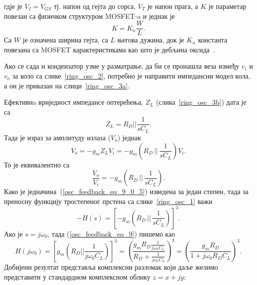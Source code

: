 \documentclass[master]{finthesis}
\begin{document}
гдје је $V_{I}=V_{GS}$ тј. напон од гејта до сорса, $V_{T}$ је напон прага, а $K$ је параметар повезан са физичком структуром MOSFET-a и једнак је
\begin{equation} 
	\label{osc_feedback_eq_9_2}
        K = K_{n} \frac{W}{L}.
\end{equation}
Са $W$ је означена ширина гејта, са $L$ његова дужина, док је $K_{n}$ константа повезана са MOSFET карактеристикама као што је дебљина оксида~\cite{AGARWAL:2005foundations}. \par
Ако се сада и кондензатор узме у разматрање, да би се пронашла веза између $v_i$ и $v_o$ за коло са слике~\ref{ring_osc_2}, потребно је направити импедансни модел кола, а он је приказан на слици~\ref{ring_osc_3a}. \par

Ефективнa вриједност импедансе оптерећења, $Z_L$ (слика~\ref{ring_osc_3b}) дата је са
\begin{equation} 
	\label{osc_feedback_eq_9_0_3}
	Z_L = R_{D} || \dfrac{1}{sC_L}.
\end{equation}
Тада је израз за амплитуду излаза ($V_o$) једнак 
\begin{equation} 
	\label{osc_feedback_eq_9_0_4}
	V_o = -g_{m}Z_{L}V_{i} = -g_{m}\left(R_{D}\,||\,\dfrac{1}{sC_{L}}\right)V_{i}.
\end{equation}
То је еквивалентно са
\begin{equation} 
	\label{osc_feedback_eq_9_0_5}
	\frac{V_o}{V_i} = -g_{m}\left(R_{D}\,||\,\dfrac{1}{sC_{L}}\right).
\end{equation}
Како је једначина~(\ref{osc_feedback_eq_9_0_5}) изведена за један степен, тада за преносну функцију тростепеног прстена са слике~\ref{ring_osc_1} важи~\cite{Razavi:PLL_CMOS_2020}
\begin{equation} 
	\label{osc_feedback_eq_9}
	-H(s) = \left[-g_{m}\left(R_{D}\,||\,\frac{1}{sC_{L}}\right)\right]^{3}.
\end{equation}
Ако је $s=j\omega_{0}$, тада (\ref{osc_feedback_eq_9}) пишемо као
\begin{equation} 
	\label{osc_feedback_eq_10}
	\displaystyle
	H(j\omega_{0}) = \left[g_{m}\left(R_{D}||\frac{1}{j\omega_{0}C_{L}}\right)\right]^{3} = \left(\frac{g_{m}R_{D}\displaystyle\frac{1}{j\omega_{0}C_{L}}}{R_{D}+\displaystyle\frac{1}{j\omega_{0}C_{L}}}\right)^{3} = \left(\frac{g_{m}R_{D}}{1+j\omega_{0}R_{D}C_{L}}\right)^{3}.
\end{equation}
Добијени резултат представља комплексни разломак који даље желимо представити у стандардном комплексном облику $z = x + jy$:
\end{document}
